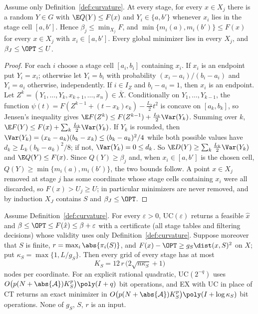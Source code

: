 \begin{lemma}\label{lem:cells}
Assume only Definition~\ref{def:curvature}. At every stage, for every
$x\in X_j$ there is a random $Y\in G$ with $\E Q(Y)\le F(x)$ and
$Y_i\in\{a,b'\}$ whenever $x_i$ lies in the stage cell $[a,b']$. Hence
$\beta_j\le\min_{X_j}F$, and $\min\{m_i(a),m_i(b')\}\le F(x)$ for every
$x\in X_j$ with $x_i\in[a,b']$. Every global minimizer lies in every $X_j$,
and $\beta_J\le\OPT\le U$.
\end{lemma}

\begin{proof}
For each $i$ choose a stage cell $[a_i,b_i]$ containing $x_i$. If $x_i$ is
an endpoint put $Y_i=x_i$; otherwise let $Y_i=b_i$ with probability
$(x_i-a_i)/(b_i-a_i)$ and $Y_i=a_i$ otherwise, independently. If $i\in I_Z$
and $b_i-a_i=1$, then $x_i$ is an endpoint. Let
$Z^{k}=(Y_1,\dots,Y_k,x_{k+1},\dots,x_n)\in\bar X$. Conditionally on
$Y_1,\dots,Y_{k-1}$, the function $\psi(t)=F(Z^{k-1}+(t-x_k)e_k)-\frac{L_k}2t^2$
is concave on $[a_k,b_k]$, so Jensen's inequality gives
$\E F(Z^k)\le F(Z^{k-1})+\frac{L_k}2\Var(Y_k)$. Summing over $k$,
$\E F(Y)\le F(x)+\sum_k\frac{L_k}2\Var(Y_k)$. If $Y_k$ is rounded, then
$\Var(Y_k)=(x_k-a_k)(b_k-x_k)\le(b_k-a_k)^2/4$ while both possible values have
$d_k\ge L_k(b_k-a_k)^2/8$; if not, $\Var(Y_k)=0\le d_k$. So
$\E D(Y)\ge\sum_k\frac{L_k}2\Var(Y_k)$ and $\E Q(Y)\le F(x)$. Since
$Q(Y)\ge\beta_j$ and, when $x_i\in[a,b']$ is the chosen cell, $Q(Y)\ge
\min\{m_i(a),m_i(b')\}$, the two bounds follow. A point $x\in X_j$ removed
at stage $j$ has some coordinate whose stage cells containing $x_i$ were all
discarded, so $F(x)>U_j\ge U$; in particular minimizers are never removed,
and by induction $X_J$ contains $S$ and $\beta_J\le\OPT$.
\end{proof}

\begin{theorem}\label{thm:cells}
Assume Definition~\ref{def:curvature}. For every $\varepsilon>0$,
UC$(\varepsilon)$ returns a feasible $\hat x$ and $\beta\le\OPT\le
F(\hat x)\le\beta+\varepsilon$ with a certificate (all stage tables and
filtering decisions) whose validity uses only Definition~\ref{def:curvature}.
Suppose moreover that $S$ is finite, $r=\max_i\abs{\pi_i(S)}$, and
$F(x)-\OPT\ge g_S\dist(x,S)^2$ on $X$; put $\kappa_S=\max\{1,L/g_S\}$. Then
every grid of every stage has at most
\begin{equation}\label{eq:cellcount}
K_S=12\,r\,\bigl(2\sqrt{n\kappa_S}+1\bigr)
\end{equation}
nodes per coordinate. For an explicit rational quadratic, UC$(2^{-q})$ uses
$O\bigl(p(N+\abs{\mathcal A})K_S^p\bigr)\poly(I+q)$ bit operations, and
EX with UC in place of CT returns an exact minimizer in
$O\bigl(p(N+\abs{\mathcal A})K_S^p\bigr)\poly(I+\log\kappa_S)$ bit
operations. None of $g_S$, $S$, $r$ is an input.
\end{theorem}

